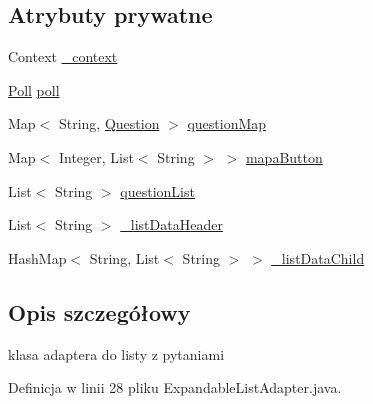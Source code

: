 \subsection*{Atrybuty prywatne}
\begin{DoxyCompactItemize}
\item 
Context \hyperlink{classcom_1_1example_1_1qrpoll_1_1_expandable_list_adapter_a7a712744eebf94bc189b44e5d04ff7da}{\+\_\+context}
\item 
\hyperlink{classcom_1_1example_1_1qrpoll_1_1_poll}{Poll} \hyperlink{classcom_1_1example_1_1qrpoll_1_1_expandable_list_adapter_a35f2a91149fc7265646cd916c54a02ef}{poll}
\item 
Map$<$ String, \hyperlink{classcom_1_1example_1_1qrpoll_1_1_question}{Question} $>$ \hyperlink{classcom_1_1example_1_1qrpoll_1_1_expandable_list_adapter_a5ec37e3c4af51739b2c0cd282b9bf208}{question\+Map}
\item 
Map$<$ Integer, List$<$ String $>$ $>$ \hyperlink{classcom_1_1example_1_1qrpoll_1_1_expandable_list_adapter_a8351d33fae079b02fb540090d49c6f2e}{mapa\+Button}
\item 
List$<$ String $>$ \hyperlink{classcom_1_1example_1_1qrpoll_1_1_expandable_list_adapter_a21519cda6be88f0b729afc1ac0cc06a5}{question\+List}
\item 
List$<$ String $>$ \hyperlink{classcom_1_1example_1_1qrpoll_1_1_expandable_list_adapter_a7290d1e184f1a8ef03ad8ea5bd4f273d}{\+\_\+list\+Data\+Header}
\item 
Hash\+Map$<$ String, List$<$ String $>$ $>$ \hyperlink{classcom_1_1example_1_1qrpoll_1_1_expandable_list_adapter_a9e3d05b47021b43ad465a1f7fa3d0ca2}{\+\_\+list\+Data\+Child}
\end{DoxyCompactItemize}


\subsection{Opis szczegółowy}
klasa adaptera do listy z pytaniami 

Definicja w linii 28 pliku Expandable\+List\+Adapter.\+java.



